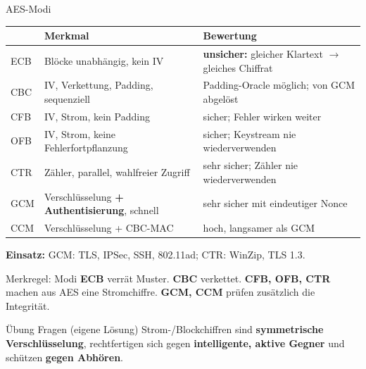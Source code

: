 \documentclass[a4paper, fontsize=7pt]{scrartcl}
\renewcommand*{\arraystretch}{1.5}  %
\begin{document}
\begin{mainbox}{AES-Modi}
\renewcommand*{\arraystretch}{1.15}
\setlength{\tabcolsep}{3pt}
\begin{tabularx}{\linewidth}{@{}l|>{\raggedright\arraybackslash}X|>{\raggedright\arraybackslash}X@{}}
 & \textbf{Merkmal} & \textbf{Bewertung} \\
\hline
ECB & Blöcke unabhängig, kein IV & \textbf{unsicher:} gleicher Klartext $\to$
  gleiches Chiffrat \\
CBC & IV, Verkettung, Padding, sequenziell & Padding-Oracle möglich; von GCM
  abgelöst \\
CFB & IV, Strom, kein Padding & sicher; Fehler wirken weiter \\
OFB & IV, Strom, keine Fehlerfortpflanzung & sicher; Keystream nie
  wiederverwenden \\
CTR & Zähler, parallel, wahlfreier Zugriff & sehr sicher; Zähler nie
  wiederverwenden \\
GCM & Verschlüsselung \textbf{+ Authentisierung}, schnell & sehr sicher mit
  eindeutiger Nonce \\
CCM & Verschlüsselung + CBC-MAC & hoch, langsamer als GCM \\
\end{tabularx}
\textbf{Einsatz:} GCM: TLS, IPSec, SSH, 802.11ad; CTR: WinZip, TLS 1.3.
\end{mainbox}

\begin{subbox}{Merkregel: Modi}
\textbf{ECB} verrät Muster. \textbf{CBC} verkettet. \textbf{CFB, OFB, CTR} machen
aus AES eine Stromchiffre. \textbf{GCM, CCM} prüfen zusätzlich die Integrität.
\end{subbox}

\begin{subbox}{Übung Fragen (eigene Lösung)}
Strom-/Blockchiffren sind \textbf{symmetrische Verschlüsselung}, rechtfertigen sich
gegen \textbf{intelligente, aktive Gegner} und schützen \textbf{gegen Abhören}.
\end{subbox}
\end{document}
